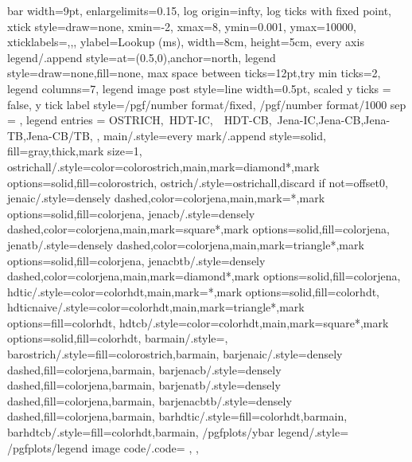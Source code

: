 {{      bar width=9pt,
      enlargelimits=0.15,
      log origin=infty,
      log ticks with fixed point,
      xtick style={draw=none},
      xmin=-2,
      xmax=8,
      ymin=0.001,
      ymax=10000,
      xticklabels={,,},
      ylabel={Lookup (ms)},
      width=8cm,
      height=5cm,
      every axis legend/.append style={at={(0.5,0)},anchor=north},
      legend style={draw=none,fill=none},
      max space between ticks=12pt,try min ticks=2,
      legend columns=7,
      legend image post style={line width=0.5pt},
      scaled y ticks = false,
      y tick label style={/pgf/number format/fixed, /pgf/number format/1000 sep = \thinspace},
      legend entries = {OSTRICH,\ HDT-IC,\ \ HDT-CB,\ Jena-IC,Jena-CB,Jena-TB,Jena-CB/TB,}
  },
  main/.style={every mark/.append style={solid, fill=gray},thick,mark size=1},
  ostrichall/.style={color=colorostrich,main,mark=diamond*,mark options={solid,fill=colorostrich}},
  ostrich/.style={ostrichall,discard if not={offset}{0}},
  jenaic/.style={densely dashed,color=colorjena,main,mark=*,mark options={solid,fill=colorjena}},
  jenacb/.style={densely dashed,color=colorjena,main,mark=square*,mark options={solid,fill=colorjena}},
  jenatb/.style={densely dashed,color=colorjena,main,mark=triangle*,mark options={solid,fill=colorjena}},
  jenacbtb/.style={densely dashed,color=colorjena,main,mark=diamond*,mark options={solid,fill=colorjena}},
  hdtic/.style={color=colorhdt,main,mark=*,mark options={solid,fill=colorhdt}},
  hdticnaive/.style={color=colorhdt,main,mark=triangle*,mark options={fill=colorhdt}},
  hdtcb/.style={color=colorhdt,main,mark=square*,mark options={solid,fill=colorhdt}},
  barmain/.style={},
  barostrich/.style={fill=colorostrich,barmain},
  barjenaic/.style={densely dashed,fill=colorjena,barmain},
  barjenacb/.style={densely dashed,fill=colorjena,barmain},
  barjenatb/.style={densely dashed,fill=colorjena,barmain},
  barjenacbtb/.style={densely dashed,fill=colorjena,barmain},
  barhdtic/.style={fill=colorhdt,barmain},
  barhdtcb/.style={fill=colorhdt,barmain},
  /pgfplots/ybar legend/.style={
      /pgfplots/legend image code/.code={%
         },
  },
}
